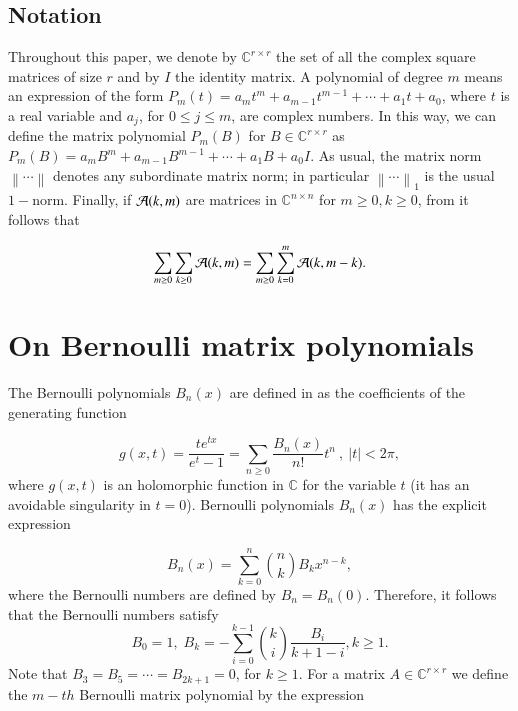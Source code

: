 \documentclass[preprint,10pt,numbers,sort&compress]{elsarticle}
\begin{document}
\subsection*{Notation}
 Throughout this paper, we denote by $\mathbb{C}^{r \times r}$ the set of all the complex square matrices of size $r$ and by $I$ the identity matrix. A polynomial of degree $m$ means an expression of the form $P_m(t)=a_{m} t^m+a_{m-1}t^{m-1}+\cdots+a_{1}t+a_{0}$, where $t$ is a real variable and $a_j$, for $0\leq j \leq m$, are complex numbers. In this way, we can define the matrix polynomial $P_m(B)$ for $B \in \mathbb{C}^{r \times r}$  as $P_m(B)=a_{m} B^m+a_{m-1}B^{m-1}+\cdots+a_{1}B+a_{0}I$.  As usual, the matrix norm $\left\|\cdots \right\|$ denotes any subordinate matrix norm; in particular $\left\| \cdots \right\|_{1}$ is the usual $1-$norm. Finally, if ${\cal A}(k, m)$ are matrices in $\mathbb{C}^{n \times n}$ for $m\geq 0, k \geq 0$, from \cite{rainville1960special} it follows that

\begin{equation}\label{rainville}
\sum_{m \geq 0} \sum_{k \geq 0} {\cal A}(k, m)=\sum_{m \geq 0} \sum_{k=0}^{m} {\cal A}(k, m-k).
\end{equation}

\section{On Bernoulli matrix polynomials}\label{sec:Bernoulli}
The Bernoulli polynomials $B_n(x)$ are defined in \cite[p.588]{olver2010nist} as the coefficients of the generating function

\begin{equation}\label{Bernoulli1}
g(x, t)= \frac{t e^{tx}}{e^t-1}=\sum_{n \geq 0} \frac{B_n(x)}{n!}t^n  \ , \ |t|<2\pi,
\end{equation}
where $g(x, t)$ is an holomorphic function in $\mathbb{C}$ for the variable $t$ (it has an avoidable singularity in $t=0$). 
Bernoulli polynomials  $B_n(x)$ has the explicit expression

\begin{equation}\label{Bernoulli2}
B_n(x)=\sum_{k=0}^{n} {n \choose k} B_k x^{n-k},
\end{equation}
where the Bernoulli numbers are defined by $B_n=B_n(0)$. Therefore, it follows that the Bernoulli numbers satisfy
\begin{equation}\label{Bernoulli3a}
B_0=1, \; \displaystyle  B_{k}= -\sum_{i=0}^{k-1} {k \choose i} \frac{B_i}{k+1-i}, k \geq 1.
\end{equation}
Note that $ B_{3}=B_{5}=\cdots=B_{2k+1}=0$, for
$k\geq 1$. For a matrix $A \in \mathbb{C}^{r \times r}$ we define the $m-th$ Bernoulli matrix polynomial by the expression
\end{document}
